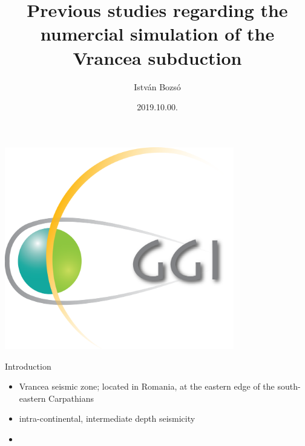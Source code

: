 \documentclass{beamer}
\title[GGI, Sopron 2019]{Previous studies regarding the numercial simulation of
                         the Vrancea subduction}
\author[István Bozsó]{István Bozsó}
\institute[MTA CSFK GGI]{MTA CSFK Geodetic and Geophysical Institute}
\date{2019.10.00.}
\begin{document}
\begin{frame}
    \titlepage
    \begin{center}
        \begin{minipage}[c]{0.3\textwidth}
            \includegraphics[width=0.75\textwidth]{ggi_logo.png}
        \end{minipage}
    \end{center}
\end{frame}


\def\ft{Introduction}

\begin{frame}{\ft}
    \begin{itemize}
        \item Vrancea seismic zone; located in Romania, at the eastern edge
        of the south-eastern Carpathians
        \item intra-continental, intermediate depth seismicity
        \item 
    
    \end{itemize}
\end{frame}
\end{document}
